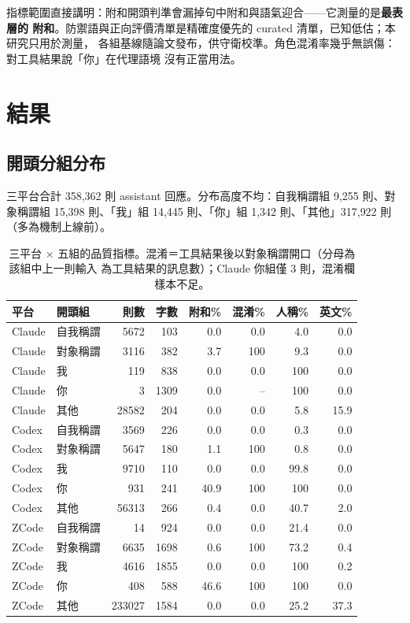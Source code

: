 \documentclass[10pt,twocolumn]{article}
\begin{document}
指標範圍直接講明：附和開頭判準會漏掉句中附和與語氣迎合——它測量的是\textbf{最表層的
附和}。防禦語與正向評價清單是精確度優先的 curated 清單，已知低估；本研究只用於測量，
各組基線隨論文發布，供守衛校準。角色混淆率幾乎無誤傷：對工具結果說「你」在代理語境
沒有正當用法。

\section{結果}
\subsection{開頭分組分布}
三平台合計 358{,}362 則 assistant 回應。分布高度不均：自我稱謂組 9{,}255 則、對象稱謂組
15{,}398 則、「我」組 14{,}445 則、「你」組 1{,}342 則、「其他」317{,}922 則（多為機制上線前）。

\begin{table}[t]
\centering
\small
\setlength{\tabcolsep}{3.5pt}
\begin{tabular}{llrrrrrr}
\toprule
平台 & 開頭組 & 則數 & 字數 & 附和\% & 混淆\% & 人稱\% & 英文\% \\
\midrule
Claude & 自我稱謂 & 5672 & 103 & 0.0 & 0.0 & 4.0 & 0.0 \\
Claude & 對象稱謂 & 3116 & 382 & 3.7 & 100 & 9.3 & 0.0 \\
Claude & 我 & 119 & 838 & 0.0 & 0.0 & 100 & 0.0 \\
Claude & 你 & 3 & 1309 & 0.0 & -- & 100 & 0.0 \\
Claude & 其他 & 28582 & 204 & 0.0 & 0.0 & 5.8 & 15.9 \\
\midrule
Codex & 自我稱謂 & 3569 & 226 & 0.0 & 0.0 & 0.3 & 0.0 \\
Codex & 對象稱謂 & 5647 & 180 & 1.1 & 100 & 0.8 & 0.0 \\
Codex & 我 & 9710 & 110 & 0.0 & 0.0 & 99.8 & 0.0 \\
Codex & 你 & 931 & 241 & 40.9 & 100 & 100 & 0.0 \\
Codex & 其他 & 56313 & 266 & 0.4 & 0.0 & 40.7 & 2.0 \\
\midrule
ZCode & 自我稱謂 & 14 & 924 & 0.0 & 0.0 & 21.4 & 0.0 \\
ZCode & 對象稱謂 & 6635 & 1698 & 0.6 & 100 & 73.2 & 0.4 \\
ZCode & 我 & 4616 & 1855 & 0.0 & 0.0 & 100 & 0.2 \\
ZCode & 你 & 408 & 588 & 46.6 & 100 & 100 & 0.0 \\
ZCode & 其他 & 233027 & 1584 & 0.0 & 0.0 & 25.2 & 37.3 \\
\bottomrule
\end{tabular}
\caption{三平台 × 五組的品質指標。混淆＝工具結果後以對象稱謂開口（分母為該組中上一則輸入
為工具結果的訊息數）；Claude 你組僅 3 則，混淆欄樣本不足。}
\label{tab:main}
\end{table}
\end{document}
